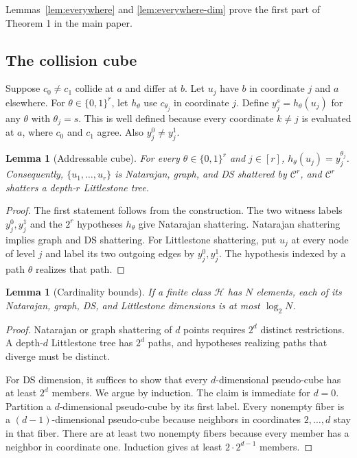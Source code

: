 \documentclass[twoside]{article}
\newtheorem{lemma}[theorem]{Lemma}
\newcommand{\C}{\mathcal C}
\begin{document}
Lemmas~\ref{lem:everywhere} and \ref{lem:everywhere-dim} prove the first part of Theorem 1 in the main paper.

\subsection{The collision cube}

Suppose $c_0\neq c_1$ collide at $a$ and differ at $b$. Let $u_j$ have $b$ in coordinate $j$ and $a$ elsewhere. For $\theta\in\{0,1\}^r$, let $h_\theta$ use $c_{\theta_j}$ in coordinate $j$. Define $y_j^s=h_\theta(u_j)$ for any $\theta$ with $\theta_j=s$. This is well defined because every coordinate $k\neq j$ is evaluated at $a$, where $c_0$ and $c_1$ agree. Also $y_j^0\neq y_j^1$.

\begin{lemma}[Addressable cube]
\label{lem:cube}
For every $\theta\in\{0,1\}^r$ and $j\in[r]$, $h_\theta(u_j)=y_j^{\theta_j}$. Consequently, $\{u_1,\ldots,u_r\}$ is Natarajan, graph, and DS shattered by $\C^r$, and $\C^r$ shatters a depth-$r$ Littlestone tree.
\end{lemma}

\begin{proof}
The first statement follows from the construction. The two witness labels $y_j^0,y_j^1$ and the $2^r$ hypotheses $h_\theta$ give Natarajan shattering. Natarajan shattering implies graph and DS shattering. For Littlestone shattering, put $u_j$ at every node of level $j$ and label its two outgoing edges by $y_j^0,y_j^1$. The hypothesis indexed by a path $\theta$ realizes that path.
\end{proof}

\begin{lemma}[Cardinality bounds]
\label{lem:cardinality-dim}
If a finite class $\mathcal H$ has $N$ elements, each of its Natarajan, graph, DS, and Littlestone dimensions is at most $\log_2N$.
\end{lemma}

\begin{proof}
Natarajan or graph shattering of $d$ points requires $2^d$ distinct restrictions. A depth-$d$ Littlestone tree has $2^d$ paths, and hypotheses realizing paths that diverge must be distinct.

For DS dimension, it suffices to show that every $d$-dimensional pseudo-cube has at least $2^d$ members. We argue by induction. The claim is immediate for $d=0$. Partition a $d$-dimensional pseudo-cube by its first label. Every nonempty fiber is a $(d-1)$-dimensional pseudo-cube because neighbors in coordinates $2,\ldots,d$ stay in that fiber. There are at least two nonempty fibers because every member has a neighbor in coordinate one. Induction gives at least $2\cdot2^{d-1}$ members.
\end{proof}
\end{document}
